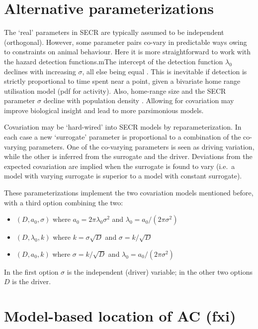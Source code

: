 \documentclass[
]{book}
\providecommand{\tightlist}{%
  \setlength{\itemsep}{0pt}\setlength{\parskip}{0pt}}
\begin{document}
\section{Alternative parameterizations}\label{parameterizations}


The `real' parameters in SECR are typically assumed to be independent (orthogonal). However, some parameter pairs co-vary in predictable ways owing to constraints on animal behaviour. Here it is more straightforward to work with the hazard detection functions.mThe intercept of the detection function \(\lambda_0\) declines with increasing \(\sigma\), all else being equal \citep{em14}. This is inevitable if detection is strictly proportional to time spent near a point, given a bivariate home range utilisation model (pdf for activity). Also, home-range size and the SECR parameter \(\sigma\) decline with population density \citep{edjq16}. Allowing for covariation may improve biological insight and lead to more parsimonious models.

Covariation may be `hard-wired' into SECR models by reparameterization. In each case a new `surrogate' parameter is proportional to a combination of the co-varying parameters. One of the co-varying parameters is seen as driving variation, while the other is inferred from the surrogate and the driver. Deviations from the expected covariation are implied when the surrogate is found to vary (i.e.~a model with varying surrogate is superior to a model with constant surrogate).

These parameterizations implement the two covariation models mentioned before, with a third option combining the two:

\begin{itemize}
\tightlist
\item
  \((D, a_0, \sigma)\) where \(a_0 = 2 \pi \lambda_0 \sigma^2\) and \(\lambda_0 = a_0 / (2 \pi \sigma^2)\)
\item
  \((D, \lambda_0, k)\) where \(k = \sigma \sqrt D\) and \(\sigma = k/\sqrt D\)
\item
  \((D, a_0, k)\) where \(\sigma = k/\sqrt D\) and \(\lambda_0 = a_0 / (2 \pi \sigma^2)\)
\end{itemize}

In the first option \(\sigma\) is the independent (driver) variable; in the other two options \(D\) is the driver.

\section{Model-based location of AC (fxi)}\label{model-based-location-of-ac-fxi}
\end{document}
